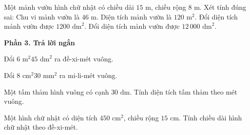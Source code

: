 \begin{ex} %
Một mảnh vườn hình chữ nhật có chiều dài $15\text{ m}$, chiều rộng $8\text{ m}$. Xét tính đúng sai:
\choiceTF
{\True Chu vi mảnh vườn là $46\text{ m}$.}
{\True Diện tích mảnh vườn là $120\text{ m}^2$.}
{Đổi diện tích mảnh vườn được $1200\text{ dm}^2$.}
{\True Đổi diện tích mảnh vườn được $12\,000\text{ dm}^2$.}
\end{ex}

\textbf{Phần 3. Trả lời ngắn}

\begin{ex} %
Đổi $6\text{ m}^2 45\text{ dm}^2$ ra đề-xi-mét vuông.
\end{ex}

\begin{ex} %
Đổi $8\text{ cm}^2 30\text{ mm}^2$ ra mi-li-mét vuông.
\end{ex}

\begin{ex} %
Một tấm thảm hình vuông có cạnh $30\text{ dm}$. Tính diện tích tấm thảm theo mét vuông.
\end{ex}

\begin{ex} %
Một hình chữ nhật có diện tích $450\text{ cm}^2$, chiều rộng $15\text{ cm}$. Tính chiều dài hình chữ nhật theo đề-xi-mét.
\end{ex}

